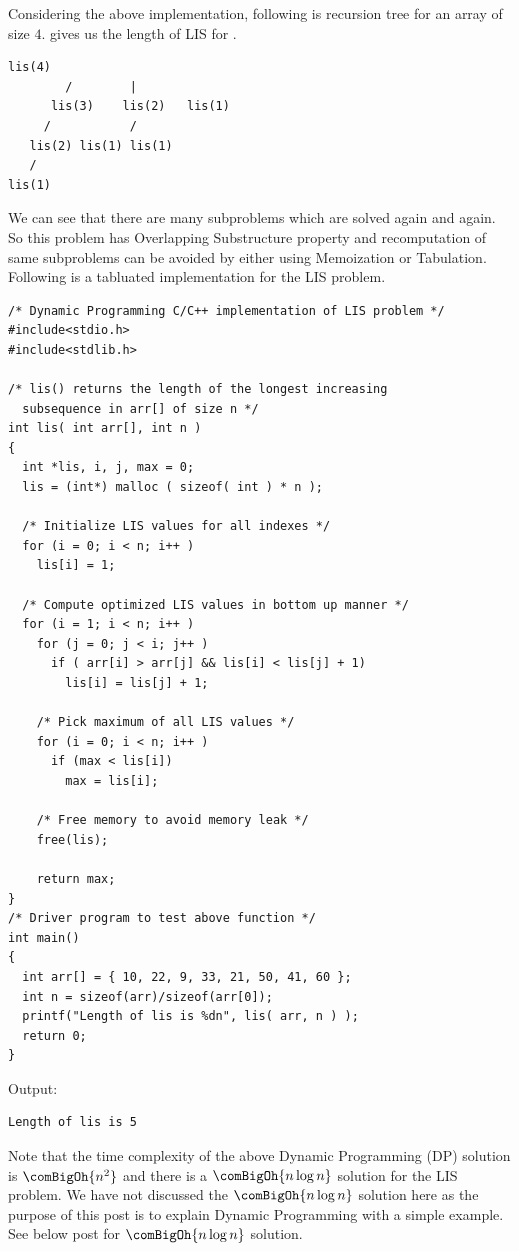 Considering the above implementation, following is recursion tree for an
array of size $4$.  gives us the length of LIS for .
\begin{lstlisting}[style=pseudostyle]
              lis(4)
        /        |     
      lis(3)    lis(2)   lis(1)
     /           /
   lis(2) lis(1) lis(1)
   /
lis(1)
\end{lstlisting}
We can see that there are many subproblems which are solved again and again.
So this problem has Overlapping Substructure property and recomputation of
same subproblems can be avoided by either using Memoization or Tabulation.
Following is a tabluated implementation for the LIS problem.
\begin{lstlisting}[style=raycppnewsnippet]
/* Dynamic Programming C/C++ implementation of LIS problem */
#include<stdio.h>
#include<stdlib.h>
 
/* lis() returns the length of the longest increasing
  subsequence in arr[] of size n */
int lis( int arr[], int n )
{
  int *lis, i, j, max = 0;
  lis = (int*) malloc ( sizeof( int ) * n );
 
  /* Initialize LIS values for all indexes */
  for (i = 0; i < n; i++ )
    lis[i] = 1;
 
  /* Compute optimized LIS values in bottom up manner */
  for (i = 1; i < n; i++ )
    for (j = 0; j < i; j++ ) 
      if ( arr[i] > arr[j] && lis[i] < lis[j] + 1)
        lis[i] = lis[j] + 1;
 
    /* Pick maximum of all LIS values */
    for (i = 0; i < n; i++ )
      if (max < lis[i])
        max = lis[i];
 
    /* Free memory to avoid memory leak */
    free(lis);
 
    return max;
}
/* Driver program to test above function */
int main()
{
  int arr[] = { 10, 22, 9, 33, 21, 50, 41, 60 };
  int n = sizeof(arr)/sizeof(arr[0]);
  printf("Length of lis is %dn", lis( arr, n ) );
  return 0;
}
\end{lstlisting}

Output:
\begin{lstlisting}[style=rayio]
Length of lis is 5
\end{lstlisting}
Note that the time complexity of the above Dynamic Programming (DP) solution
is $\comBigOh{n^2}$ and there is a $\comBigOh{n\log n}$ solution for the LIS
problem. We have not discussed the $\comBigOh{n\log n}$ solution here as the
purpose of this post is to explain Dynamic Programming with a simple
example. See below post for $\comBigOh{n\log n}$ solution.

